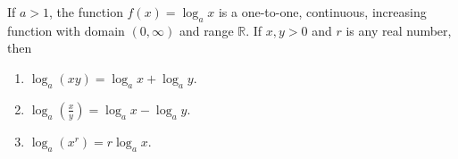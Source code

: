 \begin{frame}
\begin{theorem}
If $a > 1$, the function $f(x) = \log_a x$ is a one-to-one, continuous, increasing function with domain $(0, \infty )$ and range $\mathbb{R}$.  If $x, y > 0$ and $r$ is any real number, then
\begin{enumerate}
\item  $\log_a (xy) = \log_a x + \log_a y$.
\item  $\log_a \left( \frac{x}{y}\right) = \log_a x - \log_a y$.
\item  $\log_a (x^r) = r\log_a x$.
\end{enumerate}
\end{theorem}
\end{frame}
